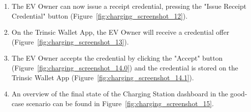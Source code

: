 \begin{enumerate}
    \item The EV Owner can now issue a receipt credential, pressing the "Issue Receipt Credential" button (Figure~\ref{fig:charging_screenshot_12}).
    \item On the Trinsic Wallet App, the EV Owner will receive a credential offer (Figure~\ref{fig:charging_screenshot_13}).
    \item The EV Owner accepts the credential by clicking the "Accept" button (Figure~\ref{fig:charging_screenshot_14.0}) and the credential is stored on the Trinsic Wallet App (Figure~\ref{fig:charging_screenshot_14.1}).
    \item An overview of the final state of the Charging Station dashboard in the good-case scenario can be found in Figure~\ref{fig:charging_screenshot_15}.
\end{enumerate}




